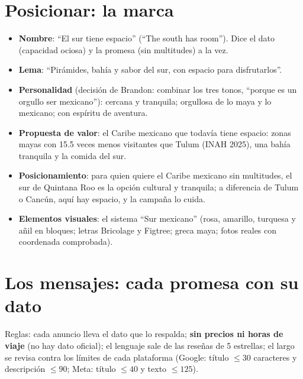 \section{Posicionar: la marca}
\begin{itemize}
\item \textbf{Nombre}: ``El sur tiene espacio'' (``The south has room''). Dice el dato (capacidad ociosa) y la promesa (sin
  multitudes) a la vez.
\item \textbf{Lema}: ``Pirámides, bahía y sabor del sur, con espacio para disfrutarlos''.
\item \textbf{Personalidad} (decisión de Brandon: combinar los tres tonos, ``porque es un orgullo ser mexicano''): cercana y
  tranquila; orgullosa de lo maya y lo mexicano; con espíritu de aventura.
\item \textbf{Propuesta de valor}: el Caribe mexicano que todavía tiene espacio: zonas mayas con 15.5 veces menos visitantes
  que Tulum (INAH 2025), una bahía tranquila y la comida del sur.
\item \textbf{Posicionamiento}: para quien quiere el Caribe mexicano sin multitudes, el sur de Quintana Roo es la opción
  cultural y tranquila; a diferencia de Tulum o Cancún, aquí hay espacio, y la campaña lo cuida.
\item \textbf{Elementos visuales}: el sistema ``Sur mexicano'' (rosa, amarillo, turquesa y añil en bloques; letras Bricolage
  y Figtree; greca maya; fotos reales con coordenada comprobada).
\end{itemize}

\section{Los mensajes: cada promesa con su dato}
Reglas: cada anuncio lleva el dato que lo respalda; \textbf{sin precios ni horas de viaje} (no hay dato oficial); el
lenguaje sale de las reseñas de 5 estrellas; el largo se revisa contra los límites de cada plataforma (Google: título
$\le30$ caracteres y descripción $\le90$; Meta: título $\le40$ y texto $\le125$).

